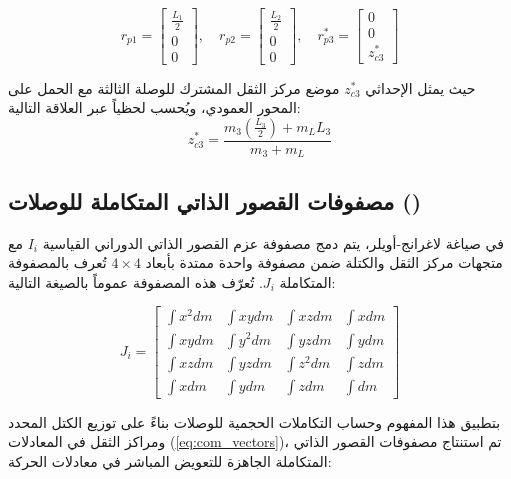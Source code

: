 \begin{equation}
r_{p1} = \begin{bmatrix} \frac{L_1}{2} \\ 0 \\ 0 \end{bmatrix} , \quad 
r_{p2} = \begin{bmatrix} \frac{L_2}{2} \\ 0 \\ 0 \end{bmatrix} , \quad 
r_{p3}^* = \begin{bmatrix} 0 \\ 0 \\ z_{c3}^* \end{bmatrix}
\label{eq:com_vectors}
\end{equation}

حيث يمثل الإحداثي $z_{c3}^*$ موضع مركز الثقل المشترك للوصلة الثالثة مع الحمل على المحور العمودي، ويُحسب لحظياً عبر العلاقة التالية:
\begin{equation}
z_{c3}^* = \frac{m_3 \left(\frac{L_3}{2}\right) + m_L L_3}{m_3 + m_L}
\label{eq:zc3_star}
\end{equation}

\subsection{مصفوفات القصور الذاتي المتكاملة للوصلات ()}
في صياغة لاغرانج-أويلر، يتم دمج مصفوفة عزم القصور الذاتي الدوراني القياسية $I_i$ مع متجهات مركز الثقل والكتلة ضمن مصفوفة واحدة ممتدة بأبعاد $4 \times 4$ تُعرف بالمصفوفة المتكاملة $J_i$. تُعرّف هذه المصفوفة عموماً بالصيغة التالية:

\begin{equation}
J_i = \begin{bmatrix} 
\int x^2 dm & \int xy dm & \int xz dm & \int x dm \\ 
\int xy dm & \int y^2 dm & \int yz dm & \int y dm \\ 
\int xz dm & \int yz dm & \int z^2 dm & \int z dm \\ 
\int x dm & \int y dm & \int z dm & \int dm 
\end{bmatrix}
\end{equation}

بتطبيق هذا المفهوم وحساب التكاملات الحجمية للوصلات بناءً على توزيع الكتل المحدد ومراكز الثقل في المعادلات (\ref{eq:com_vectors})، تم استنتاج مصفوفات القصور الذاتي المتكاملة الجاهزة للتعويض المباشر في معادلات الحركة:

